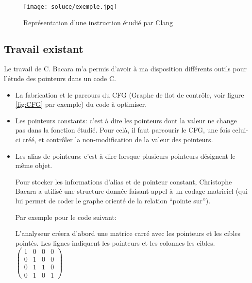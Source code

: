 \documentclass[11pt]{article}
\begin{document}
    \begin{figure}[H]
      \centering
      \texttt{[image: soluce/exemple.jpg]} 
      \caption{Représentation d'une instruction étudié par Clang}
      \label{fig:exemple}
    \end{figure}

  \subsection{Travail existant}

    Le travail de C. Bacara m'a permis d'avoir à ma disposition différents outils pour l'étude des pointeurs dans un code C.

    \begin{itemize}
      \item La fabrication et le parcours du CFG (Graphe de flot de
        contrôle, voir figure \ref{fig:CFG} par exemple) du code à optimiser.
      \item Les pointeurs constants: c'est à dire les pointeurs dont la valeur ne change pas dans la fonction étudié.
      Pour celà, il faut parcourir le CFG, une fois celui-ci créé, et contrôler la non-modification de la valeur des pointeurs.
      \item Les alias de pointeurs: c'est à dire lorsque plusieurs pointeurs désignent le même objet.
      
      Pour stocker les informations d'alias et de pointeur constant,
      Christophe Bacara a utilisé une structure donnée faisant appel à
      un codage matriciel (qui lui permet de coder le graphe orienté de la relation ``pointe sur'').
      
      Par exemple pour le code suivant:
      
      
      
      L'analyseur créera d'abord une matrice carré avec les pointeurs et les cibles pointés. Les lignes indiquent les pointeurs et les colonnes les cibles.\\
      \label{alias}
     \begin{math}
      \begin{pmatrix}
	1 & 0 & 0 &  0 \\
	0 & 1 & 0 & 0 \\
	0 & 1 & 1 & 0  \\
	0 & 1 & 0 & 1 
      \end{pmatrix}
     \end{math}
     \\
     

\end{itemize}
\end{document}
